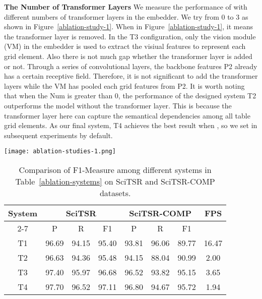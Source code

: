\documentclass[review]{elsarticle}
\begin{document}
\textbf{The Number of Transformer Layers} We measure the performance of  with different numbers of transformer layers in the embedder. We try from 0 to 3 as shown in Figure~\ref{ablation-study-1}. When  in Figure~\ref{ablation-study-1}, it means the transformer layer is removed. In the T3 configuration, only the vision module (VM) in the embedder is used to extract the visiual features to represent each grid element. Also there is not much gap whether the transformer layer is added or not. Through a series of convolutional layers, the backbone features P2 already has a certain receptive field. Therefore, it is not significant to add the transformer layers while the VM has pooled each grid features from P2. It is worth noting that when the Num is greater than 0, the performance of the designed system T2 outperforms the model without the transformer layer. This is because the transformer layer here can capture the semantical dependencies among all table grid elements. As our final system, T4 achieves the best result when , so we set  in subsequent experiments by default.

\begin{figure*}[!htb]
	\centerline{\texttt{[image: ablation-studies-1.png]}}
	\caption{Performance by varying number of transformer layers in T2, T3, T4 on the SciTSR test dataset.}
	\label{ablation-study-1}
\end{figure*}

\begin{table}[!htp]
	\centering
	\renewcommand\arraystretch{1.1}
	\setlength{\tabcolsep}{3.3mm}
	
	\caption{Comparison of F1-Measure among different systems in Table~\ref{ablation-systems} on SciTSR and SciTSR-COMP datasets.}
	\label{ablation-studies}
	\begin{tabular}{c|c|c|c|c|c|c|c}
		\hline
		\multirow{2}{*}{System} & \multicolumn{3}{c|}{SciTSR} & \multicolumn{3}{c|}{SciTSR-COMP} & \multirow{2}{*}{FPS} \\ \cline{2-7} 
		& P       & R       & F1      & P       & R        & F1       & \\ \hline
		T1        & 96.69   & 94.15   & 95.40   & 93.81    & 96.06    & 89.77     & 16.47   \\
		T2        & 96.63   & 94.36   & 95.48   & 94.15    & 88.04    & 90.99     & 2.00	\\
		T3        & 97.40   & 95.97   & 96.68   & 96.52    & 93.82    & 95.15     & 3.65	\\
		T4        & 97.70   & 96.52   & 97.11   & 96.80    & 94.67    & 95.72     & 1.94	\\ \hline
	\end{tabular}
\end{table}
\end{document}
